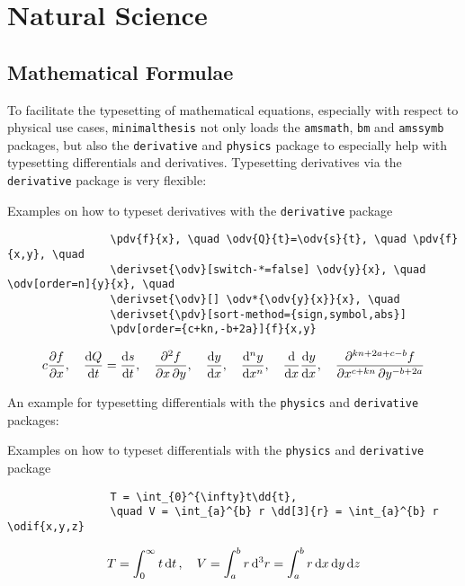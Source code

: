 \chapter{Natural Science}
	\section{Mathematical Formulae}
		To facilitate the typesetting of mathematical equations, especially with respect to physical use cases, \verb|minimalthesis| not only loads the \verb|amsmath|, \verb|bm| and \verb|amssymb| packages, but also the \verb|derivative| and \verb|physics| package to especially help with typesetting differentials and derivatives.
		\newline Typesetting derivatives via the \verb|derivative| package is very flexible: 
		\begin{table}[h!]
			\centering
			\caption{Examples on how to typeset derivatives with the \texttt{derivative} package}
			\begin{verbatim}
				\pdv{f}{x}, \quad \odv{Q}{t}=\odv{s}{t}, \quad \pdv{f}{x,y}, \quad 
				\derivset{\odv}[switch-*=false] \odv{y}{x}, \quad \odv[order=n]{y}{x}, \quad
				\derivset{\odv}[] \odv*{\odv{y}{x}}{x}, \quad 
				\derivset{\pdv}[sort-method={sign,symbol,abs}] 
				\pdv[order={c+kn,-b+2a}]{f}{x,y}
			\end{verbatim}
			\begin{align*}{c}
				\pdv{f}{x}, \quad \odv{Q}{t}=\odv{s}{t}, \quad \pdv{f}{x,y}, \quad 
				\derivset{\odv}[switch-*=false] \odv{y}{x}, \quad \odv[order=n]{y}{x}, \quad
				\derivset{\odv}[] \odv*{\odv{y}{x}}{x}, \quad 
				\derivset{\pdv}[sort-method={sign,symbol,abs}] \pdv[order={c+kn,-b+2a}]{f}{x,y}
			\end{align*}
		\end{table}
		An example for typesetting differentials with the \verb|physics| and \verb|derivative| packages:
		\begin{table}[h!]
			\centering
			\caption{Examples on how to typeset differentials with the \texttt{physics} and \texttt{derivative} package}
			\begin{verbatim}
				T = \int_{0}^{\infty}t\dd{t}, 
				\quad V = \int_{a}^{b} r \dd[3]{r} = \int_{a}^{b} r \odif{x,y,z}
			\end{verbatim}
			\begin{align*}
				T = \int_{0}^{\infty}t\dd{t}, \quad V = \int_{a}^{b} r \dd[3]{r} = \int_{a}^{b} r \odif{x,y,z}
			\end{align*}
			
		\end{table}
	
